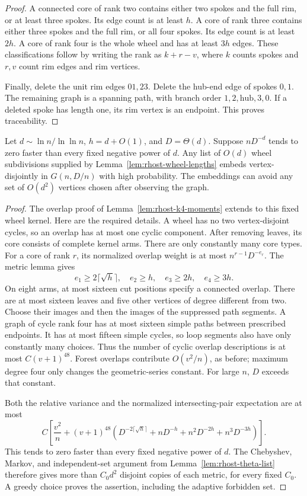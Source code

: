 \begin{proof}
A connected core of rank two contains either two spokes and the full rim, or at least three spokes.
Its edge count is at least $h$.
A core of rank three contains either three spokes and the full rim, or all four spokes.
Its edge count is at least $2h$.
A core of rank four is the whole wheel and has at least $3h$ edges.
These classifications follow by writing the rank as $k+r-v$,
where $k$ counts spokes and $r,v$ count rim edges and rim vertices.

Finally, delete the unit rim edges $01,23$.
Delete the hub-end edge of spokes $0,1$.
The remaining graph is a spanning path, with branch order $1,2,\text{hub},3,0$.
If a deleted spoke has length one, its rim vertex is an endpoint.
This proves traceability.
\end{proof}

\begin{lemma}\label{lem:rhost-wheel-embeddings}
Let $d\sim\ln n/\ln\ln n$, $h=d+O(1)$, and $D=\Theta(d)$.
Suppose $nD^{-d}$ tends to zero faster than every fixed negative power of $d$.
Any list of $O(d)$ wheel subdivisions supplied by Lemma~\ref{lem:rhost-wheel-lengths}
embeds vertex-disjointly in $G(n,D/n)$ with high probability.
The embeddings can avoid any set of $O(d^2)$ vertices chosen after observing the graph.
\end{lemma}

\begin{proof}
The overlap proof of Lemma~\ref{lem:rhost-k4-moments} extends to this fixed wheel kernel.
Here are the required details.
A wheel has no two vertex-disjoint cycles, so an overlap has at most one cyclic component.
After removing leaves, its core consists of complete kernel arms.
There are only constantly many core types.
For a core of rank $r$, its normalized overlap weight is at most $n^{r-1}D^{-e_r}$.
The metric lemma gives
\[
 e_1\ge2\lceil\sqrt h\rceil,\quad e_2\ge h,\quad e_3\ge2h,\quad e_4\ge3h.
\]
On eight arms, at most sixteen cut positions specify a connected overlap.
There are at most sixteen leaves and five other vertices of degree different from two.
Choose their images and then the images of the suppressed path segments.
A graph of cycle rank four has at most sixteen simple paths between prescribed endpoints.
It has at most fifteen simple cycles, so loop segments also have only constantly many choices.
Thus the number of cyclic overlap descriptions is at most $C(v+1)^{48}$.
Forest overlaps contribute $O(v^2/n)$, as before; maximum degree four only changes the geometric-series constant.
For large $n$, $D$ exceeds that constant.

Both the relative variance and the normalized intersecting-pair expectation are at most
\[
 C\left[\frac{v^2}n+(v+1)^{48}
 \left(D^{-2\lceil\sqrt h\rceil}+nD^{-h}+n^2D^{-2h}+n^3D^{-3h}\right)\right].
\]
This tends to zero faster than every fixed negative power of $d$.
The Chebyshev, Markov, and independent-set argument from Lemma~\ref{lem:rhost-theta-list}
therefore gives more than $C_0d^2$ disjoint copies of each metric, for every fixed $C_0$.
A greedy choice proves the assertion, including the adaptive forbidden set.
\end{proof}

